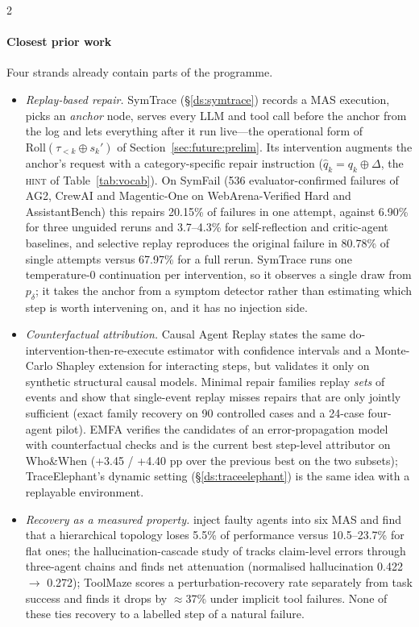 \begin{multicols}{2}
\paragraph{Closest prior work} Four strands already contain parts of the programme.
\begin{itemize}[leftmargin=1.1em]
\item \emph{Replay-based repair.} SymTrace \cite{luan2026symtrace} (\S\ref{ds:symtrace}) records a MAS execution, picks an \emph{anchor} node, serves every LLM and tool call before the anchor from the log and lets everything after it run live---the operational form of $\mathrm{Roll}(\tau_{<k}\oplus s_k')$ of Section~\ref{sec:future:prelim}. Its intervention augments the anchor's request with a category-specific repair instruction ($\hat q_k=q_k\oplus\Delta$, the \textsc{hint} of Table~\ref{tab:vocab}). On SymFail (536 evaluator-confirmed failures of AG2, CrewAI and Magentic-One on WebArena-Verified Hard and AssistantBench) this repairs 20.15\% of failures in one attempt, against 6.90\% for three unguided reruns and 3.7--4.3\% for self-reflection and critic-agent baselines, and selective replay reproduces the original failure in 80.78\% of single attempts versus 67.97\% for a full rerun. SymTrace runs one temperature-0 continuation per intervention, so it observes a single draw from $p_\delta$; it takes the anchor from a symptom detector rather than estimating which step is worth intervening on, and it has no injection side.
\item \emph{Counterfactual attribution.} Causal Agent Replay \cite{shah2026car} states the same do-intervention-then-re-execute estimator with confidence intervals and a Monte-Carlo Shapley extension for interacting steps, but validates it only on synthetic structural causal models. Minimal repair families \cite{li2026mrfr} replay \emph{sets} of events and show that single-event replay misses repairs that are only jointly sufficient (exact family recovery on 90 controlled cases and a 24-case four-agent pilot). EMFA \cite{liao2026emfa} verifies the candidates of an error-propagation model with counterfactual checks and is the current best step-level attributor on Who\&When (+3.45 / +4.40 pp over the previous best on the two subsets); TraceElephant's dynamic setting (\S\ref{ds:traceelephant}) is the same idea with a replayable environment.
\item \emph{Recovery as a measured property.} \citet{huang2024resilience} inject faulty agents into six MAS and find that a hierarchical topology loses 5.5\% of performance versus 10.5--23.7\% for flat ones; the hallucination-cascade study of \citet{jamshidi2026cascade} tracks claim-level errors through three-agent chains and finds net attenuation (normalised hallucination 0.422 $\to$ 0.272); ToolMaze \cite{zhu2026toolmaze} scores a perturbation-recovery rate separately from task success and finds it drops by $\approx$37\% under implicit tool failures. None of these ties recovery to a labelled step of a natural failure.

\end{itemize}
\end{multicols}
